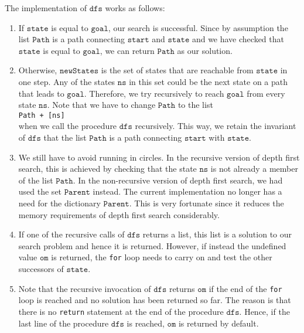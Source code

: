 The implementation of $\mathtt{dfs}$ works as follows:
\begin{enumerate}
\item If $\mathtt{state}$ is equal to $\mathtt{goal}$, our search is successful. Since by assumption
      the list $\mathtt{Path}$ is a path connecting $\mathtt{start}$ and $\mathtt{state}$ and we
      have checked that $\mathtt{state}$ is equal to $\mathtt{goal}$, we can return $\mathtt{Path}$ as our solution.
\item Otherwise, $\mathtt{newStates}$ is the set of states that are reachable from $\mathtt{state}$
      in one step.  Any of the states $\mathtt{ns}$ in this set could be the next state on a path
      that leads to $\mathtt{goal}$.  Therefore, we try recursively to reach $\mathtt{goal}$ from
      every state $\mathtt{ns}$.  Note that we have to change $\mathtt{Path}$ to the list
      \\[0.2cm]
      \hspace*{1.3cm}
      \texttt{Path + [ns]}
      \\[0.2cm]
      when we call the procedure $\mathtt{dfs}$ recursively.  This way, we retain the invariant of
      $\mathtt{dfs}$ that the list $\mathtt{Path}$ is a path connecting $\mathtt{start}$ with $\mathtt{state}$.
\item We still have to avoid running in circles.  In the recursive version of depth first search,
      this is achieved by checking that the state $\mathtt{ns}$ is not already a member of the list $\mathtt{Path}$.  In the
      non-recursive version of depth first search, we had used the set $\mathtt{Parent}$ instead.
      The current implementation no longer has a need for the dictionary $\mathtt{Parent}$.  This is very
      fortunate since it reduces the memory requirements of depth first search considerably.
\item If one of the recursive calls of $\mathtt{dfs}$ returns a list, this list is a solution to our
      search problem and hence it is returned.  However, if instead the undefined value
      $\mathtt{om}$ is returned, the \texttt{for} loop needs to carry on and test the other
      successors of $\mathtt{state}$.
\item Note that the recursive invocation of $\mathtt{dfs}$ returns $\mathtt{om}$ if the end of the
      \texttt{for} loop is reached and no solution has been returned so far.  The reason is that there is
      no \texttt{return} statement at the end of the procedure $\mathtt{dfs}$.  Hence, if the last
      line of the procedure $\mathtt{dfs}$ is reached, $\mathtt{om}$ is returned by default.
\end{enumerate}

